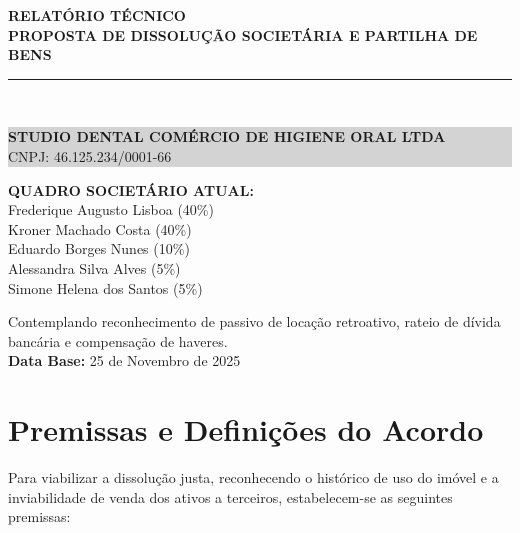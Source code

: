 \documentclass[12pt, a4paper]{article}
\begin{document}
\begin{titlepage}
    \centering
    \vspace*{3cm}
    {\Huge \textbf{\textcolor{primaryColor}{RELATÓRIO TÉCNICO}}} \\
    \vspace{0.5cm}
    {\Large \textbf{PROPOSTA DE DISSOLUÇÃO SOCIETÁRIA E PARTILHA DE BENS}} \\
    \vspace{2cm}
    \rule{10cm}{1.5pt} \\
    \vspace{0.5cm}
    \colorbox{lightGray}{%
        \parbox{0.9\textwidth}{%
            \centering
            \vspace{0.3cm}
            {\Large \textbf{STUDIO DENTAL COMÉRCIO DE HIGIENE ORAL LTDA}} \\
            \vspace{0.3cm}
            {\large CNPJ: 46.125.234/0001-66} \\
            \vspace{0.3cm}
        }%
    }
    \vspace{3cm}

    \begin{flushleft}
    \textbf{QUADRO SOCIETÁRIO ATUAL:} \\
    \vspace{0.2cm}
    Frederique Augusto Lisboa (40\%) \\
    Kroner Machado Costa (40\%) \\
    Eduardo Borges Nunes (10\%) \\
    Alessandra Silva Alves (5\%) \\
    Simone Helena dos Santos (5\%)
    \end{flushleft}

    
    \vfill
    {\small Contemplando reconhecimento de passivo de locação retroativo, rateio de dívida bancária e compensação de haveres.} \\
    \vspace{1cm}
    \textbf{Data Base:} 25 de Novembro de 2025
\end{titlepage}

\section{Premissas e Definições do Acordo}

Para viabilizar a dissolução justa, reconhecendo o histórico de uso do imóvel e a inviabilidade de venda dos ativos a terceiros, estabelecem-se as seguintes premissas:
\end{document}
